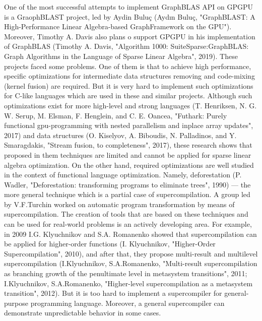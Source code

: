 \documentclass[12pt]{article}  %
\theoremstyle{remark}
\begin{document}
One of the most successful attempts to implement GraphBLAS API on GPGPU is a GraophBLAST project, led by Aydin Bulu\c{c} (Aydın Bulu\c{c}, "GraphBLAST: A High-Performance Linear Algebra-based GraphFramework on the GPU"). Moreover, Timothy A. Davis also plans o support GPGPU in his implementation of GraphBLAS (Timothy A. Davis, "Algorithm 1000: SuiteSparse:GraphBLAS: Graph Algorithms in the Language of Sparse Linear Algebra", 2019). These projects faced some problems. One of them is that to achieve high performance, specific optimizations for intermediate data structures removing and code-mixing (kernel fusion) are required. But it is very hard to implement such optimizations for C-like languages which are used in these and similar projects. Although such optimizations exist for more high-level and strong languages  (T. Henriksen, N. G. W. Serup, M. Elsman, F. Henglein, and C. E. Oancea, "Futhark: Purely functional gpu-programming with nested parallelism and inplace array updates", 2017) and data structures  (O. Kiselyov, A. Biboudis, N. Palladinos, and Y. Smaragdakis, "Stream fusion, to completeness", 2017), these research shows that proposed in them techniques are limited and cannot be applied for sparse linear algebra optimization. On the other hand, required optimizations are well studied in the context of functional language optimization. Namely, deforestation (P. Wadler, "Deforestation: transforming programs to eliminate trees", 1990) --- the more general technique which is a partial case of supercompilation. A group led by V.F.Turchin worked on automatic program transformation by means of supercompilation. The creation
of tools that are based on these techniques and can be used for real-world problems is an actively developing area. For example, in 2009 I.G. Klyuchnikov and S.A. Romanenko showed that supercompilation can be applied for higher-order functions (I. Klyuchnikov, "Higher-Order Supercompilation", 2010), and after that, they propose multi-result and multilevel supercompilation (I.Klyuchnikov, S.A.Romanenko, "Multi-result supercompilation as branching growth of the penultimate level in metasystem transitions", 2011; I.Klyuchnikov, S.A.Romanenko, "Higher-level supercompilation as a metasystem transition", 2012). But it is too hard to implement a supercompiler for general-purpose programming language. Moreover, a general supercompiler can demonstrate unpredictable behavior in some cases. 
\end{document}
